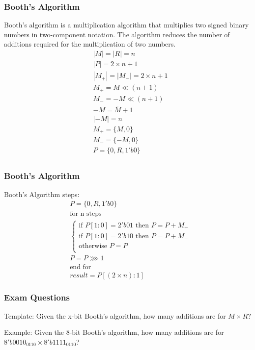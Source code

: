 \begin{frame}
    \frametitle{Booth's Algorithm}
 Booth's algorithm is a multiplication algorithm that multiplies two signed binary numbers in two-component notation.
 The algorithm reduces the number of additions required for the multiplication of two numbers.
    \begin{equation}
        \begin{aligned}
            &|M|=|R|=n\\
            &|P|=2 \times n + 1\\
            &|M_{+}|=|M_{-}|=2 \times n+1\\
            &M_{+}=M \ll (n + 1)\\
            &M_{-}=-M \ll (n + 1)\\
            &-M=\overline{M}+1\\
            &|-M|=n\\
            &M_{+}=\{M, 0\}\\
            &M_{-}=\{-M, 0\}\\
            &P=\{0,R,1'b0\}\\
        \end{aligned}
    \end{equation}
\end{frame}

\begin{frame}
    \frametitle{Booth's Algorithm}
 Booth's Algorithm steps:
    \begin{equation}
        \begin{aligned}
            &P=\{0,R,1'b0\}\\
            &\text{for n steps}\\
            &\begin{cases}
 \text{if } P[1:0]=2'b01 \text{ then } P=P+M_{+}\\
 \text{if } P[1:0]=2'b10 \text{ then } P=P+M_{-}\\
 \text{otherwise } P=P\\
            \end{cases}\\
            &P=P \ggg 1\\
            &\text{end for}\\
            &result=P[(2 \times n):1]
        \end{aligned}
    \end{equation}
\end{frame}

\begin{frame}
    \frametitle{Exam Questions}
 Template: Given the x-bit Booth's algorithm, how many additions are for $M \times R$?

 Example: Given the 8-bit Booth's algorithm, how many additions are for $8'b0010_0110 \times 8'b1111_0110$?
\end{frame}

